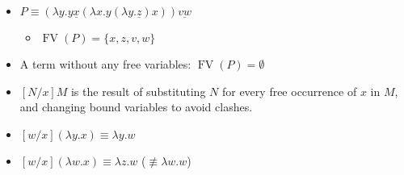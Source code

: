 \documentclass{beamer}
\DeclareMathOperator{\fv}{FV}
\begin{document}

\begin{frame}

  \begin{example}
    \begin{itemize}
    \item
      $P \equiv
      (\lambda{y}.y\underline{x}(\lambda{x}.y(\lambda{y}.\underline{z})x))\underline{vw}$
      \begin{itemize}
      \item
        $\fv(P) = \{x, z, v, w\}$
      \end{itemize}
    \end{itemize}
  \end{example}
\end{frame}


\begin{frame}

  \begin{definition}
    \begin{itemize}
    \item
      A term without any free variables: $\fv(P) = \emptyset$
    \end{itemize}
  \end{definition}
\end{frame}


\begin{frame}

  \begin{definition}[Substitution]
    \begin{itemize}
    \item
      $[N/x]M$ is the result of substituting $N$ for every free
      occurrence of $x$ in $M$, and changing bound variables to avoid
      clashes.
    \end{itemize}
  \end{definition}
\end{frame}


\begin{frame}

  \begin{examples}[Substitution]
    \begin{itemize}
    \item
      $[w/x](\lambda{y}.x) \equiv \lambda{y}.w$
    \item
      $[w/x](\lambda{w}.x) \equiv \lambda{z}.w$ \hfill ($\not\equiv
      \lambda{w}.w$)
    \end{itemize}
  \end{examples}
\end{frame}
\end{document}
